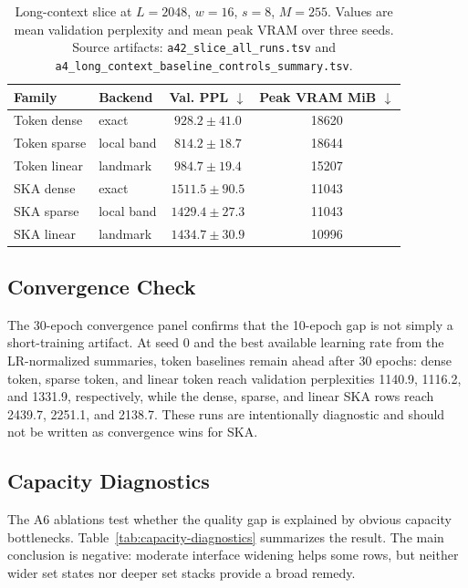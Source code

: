 \documentclass{article}
\theoremstyle{plain}
\theoremstyle{definition}
\theoremstyle{remark}
\begin{document}
\begin{table}[t]
\centering
\caption{Long-context slice at $L=2048$, $w=16$, $s=8$, $M=255$.  Values are
mean validation perplexity and mean peak VRAM over three seeds.  Source
artifacts: \texttt{a42\_slice\_all\_runs.tsv} and
\texttt{a4\_long\_context\_baseline\_controls\_summary.tsv}.}
\label{tab:long-context}
\scriptsize
\begin{tabular}{llcc}
\toprule
Family & Backend & Val. PPL $\downarrow$ & Peak VRAM MiB $\downarrow$ \\
\midrule
Token dense & exact & $928.2 \pm 41.0$ & 18620 \\
Token sparse & local band & $814.2 \pm 18.7$ & 18644 \\
Token linear & landmark & $984.7 \pm 19.4$ & 15207 \\
SKA dense & exact & $1511.5 \pm 90.5$ & 11043 \\
SKA sparse & local band & $1429.4 \pm 27.3$ & 11043 \\
SKA linear & landmark & $1434.7 \pm 30.9$ & 10996 \\
\bottomrule
\end{tabular}
\end{table}

\subsection{Convergence Check}
\label{sec:results-convergence}

The 30-epoch convergence panel confirms that the 10-epoch gap is not simply a
short-training artifact.  At seed 0 and the best available learning rate from
the LR-normalized summaries, token baselines remain ahead after 30 epochs:
dense token, sparse token, and linear token reach validation perplexities
1140.9, 1116.2, and 1331.9, respectively, while the dense, sparse, and linear
SKA rows reach 2439.7, 2251.1, and 2138.7.  These runs are intentionally
diagnostic and should not be written as convergence wins for SKA.

\subsection{Capacity Diagnostics}
\label{sec:results-capacity}

The A6 ablations test whether the quality gap is explained by obvious capacity
bottlenecks.  Table~\ref{tab:capacity-diagnostics} summarizes the result.  The
main conclusion is negative: moderate interface widening helps some rows, but
neither wider set states nor deeper set stacks provide a broad remedy.
\end{document}
